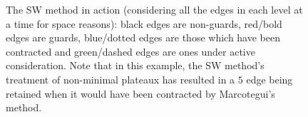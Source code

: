 \documentclass[preprint,a4paper]{elsarticle}
\newenvironment{stusubfig}[1]
{
	\begin{figure}[#1]
	\begin{center}
}
{
	\end{center}
	\end{figure}
}
\begin{document}
\begin{stusubfig}{p}
	\hspace{4mm}%
	\hspace{4mm}%
\caption[The SW method in action]{The SW method in action (considering all the edges in each level at a time for space reasons): black edges are non-guards, red/bold edges are guards, blue/dotted edges are those which have been contracted and green/dashed edges are ones under active consideration. Note that in this example, the SW method's treatment of non-minimal plateaux has resulted in a $5$ edge being retained when it would have been contracted by Marcotegui's method.}
\label{fig:segmentation-waterfall-nicholls-example}
\end{stusubfig}
\end{document}
